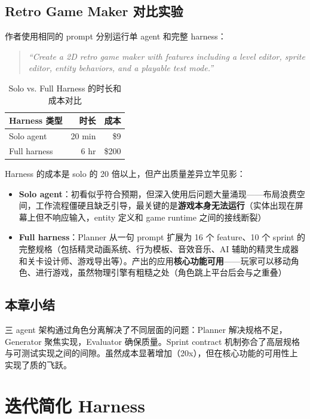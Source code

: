 \documentclass[a4paper]{article}
\begin{document}
\subsection{Retro Game Maker 对比实验}

作者使用相同的 prompt 分别运行单 agent 和完整 harness：

\begin{quote}
\textit{``Create a 2D retro game maker with features including a level editor, sprite editor, entity behaviors, and a playable test mode.''}
\end{quote}

\begin{table}[H]
\centering
\begin{tabular}{lrr}
\toprule
\textbf{Harness 类型} & \textbf{时长} & \textbf{成本} \\
\midrule
Solo agent & 20 min & \$9 \\
Full harness & 6 hr & \$200 \\
\bottomrule
\end{tabular}
\caption{Solo vs. Full Harness 的时长和成本对比}
\end{table}

Harness 的成本是 solo 的 20 倍以上，但产出质量差异立竿见影：

\begin{itemize}
    \item \textbf{Solo agent}：初看似乎符合预期，但深入使用后问题大量涌现——布局浪费空间，工作流程僵硬且缺乏引导，最关键的是\textbf{游戏本身无法运行}（实体出现在屏幕上但不响应输入，entity 定义和 game runtime 之间的接线断裂）
    \item \textbf{Full harness}：Planner 从一句 prompt 扩展为 16 个 feature、10 个 sprint 的完整规格（包括精灵动画系统、行为模板、音效音乐、AI 辅助的精灵生成器和关卡设计师、游戏导出等）。产出的应用\textbf{核心功能可用}——玩家可以移动角色、进行游戏，虽然物理引擎有粗糙之处（角色跳上平台后会与之重叠）
\end{itemize}

\subsection{本章小结}

三 agent 架构通过角色分离解决了不同层面的问题：Planner 解决规格不足，Generator 聚焦实现，Evaluator 确保质量。Sprint contract 机制弥合了高层规格与可测试实现之间的间隙。虽然成本显著增加（20x），但在核心功能的可用性上实现了质的飞跃。

\section{迭代简化 Harness}
\end{document}
